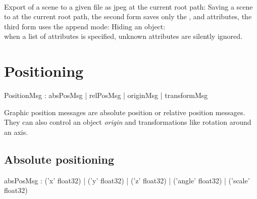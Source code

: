 \documentclass[a4paper,twoside]{report}
\newcommand{\sublevel}[1]	{\section{#1}}
\newcommand{\subsublevel}[1]	{\subsection{#1}}
\begin{document}
\example \\
Export of a scene to a given file as jpeg at the current root path:
Saving a scene to  at the current root path, the second form saves only the ,  and  attributes, the third form uses the append mode:
Hiding an object:
\note{}\\ 
when a list of attributes is specified, unknown attributes are silently ignored.


\sublevel{Positioning}
\label{positionning}

\begin{rail}
PositionMsg : 		absPosMsg 
				|	relPosMsg 
				|	originMsg 
				| 	transformMsg
\end{rail}

Graphic position messages are absolute position or relative position messages. They can also control an object \emph{origin} and transformations like rotation around an axis.

\subsublevel{Absolute positioning}
\label{abspos}


\begin{rail}
absPosMsg :  
			('x' float32)
		| 	('y' float32)
		| 	('z' float32)
		| 	('angle' float32)
		| 	('scale' float32) 
\end{rail}
\end{document}
